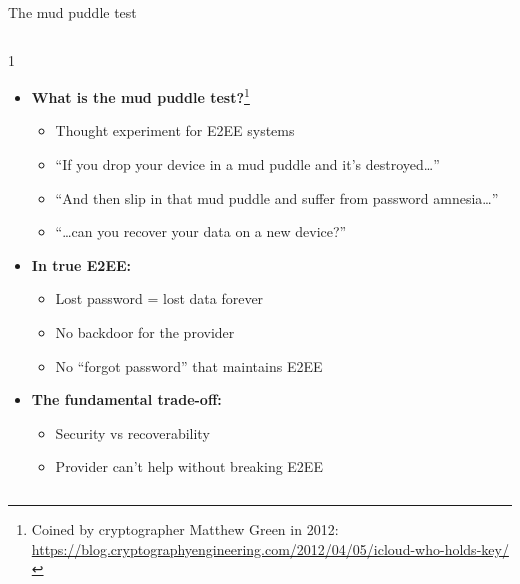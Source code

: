 \ifdefined\PRESENTATION\else\PassOptionsToClass{handout}{beamer}\fi\documentclass[aspectratio=169, lualatex]{beamer}
\begin{document}
\begin{frame}{The mud puddle test}
	\begin{columns}[c]
		\begin{column}{1\textwidth}
			\begin{itemize}
				\item \textbf{What is the mud puddle test?}\footnote{Coined by cryptographer Matthew Green in 2012: \url{https://blog.cryptographyengineering.com/2012/04/05/icloud-who-holds-key/}}
				      \begin{itemize}
					      \item Thought experiment for E2EE systems
					      \item ``If you drop your device in a mud puddle and it's destroyed\ldots''
					      \item ``And then slip in that mud puddle and suffer from password amnesia\ldots''
					      \item ``\ldots can you recover your data on a new device?''
				      \end{itemize}
				\item \textbf{In true E2EE:}
				      \begin{itemize}
					      \item Lost password = lost data forever
					      \item No backdoor for the provider
					      \item No ``forgot password'' that maintains E2EE
				      \end{itemize}
				\item \textbf{The fundamental trade-off:}
				      \begin{itemize}
					      \item Security vs recoverability
					      \item Provider can't help without breaking E2EE
				      \end{itemize}
			\end{itemize}
		\end{column}
	\end{columns}
\end{frame}
\end{document}
